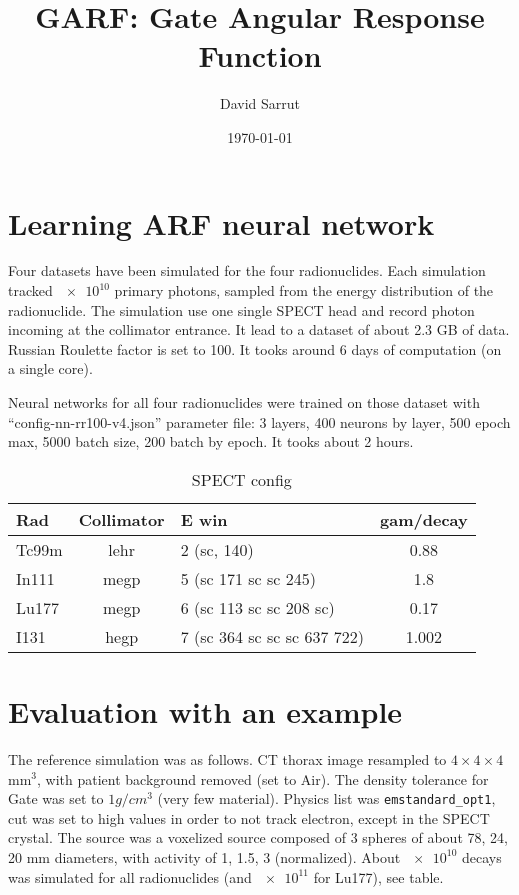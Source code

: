\documentclass[11pt,final,a4paper]{article}
\begin{document}
\thispagestyle{fancy}

\title{GARF: Gate Angular Response Function}
\author{David Sarrut}
\date{\today}

\maketitle

\section{Learning ARF neural network}

Four datasets have been simulated for the four radionuclides. Each
simulation tracked $\num{e10}$ primary photons, sampled from the
energy distribution of the radionuclide. The simulation use one single
SPECT head and record photon incoming at the collimator entrance. It
lead to a dataset of about 2.3 GB of data. Russian Roulette factor is
set to 100. It tooks around 6 days of computation (on a single core).


Neural networks for all four radionuclides were trained on those
dataset with ``config-nn-rr100-v4.json'' parameter file: 3 layers, 400
neurons by layer, 500 epoch max, 5000 batch size, 200 batch by
epoch. It tooks about 2 hours.

\begin{table}[htbp]
  \centering
  \begin{tabular}[htbp]{lclc}
    Rad & Collimator & E win & gam/decay \\\hline
    Tc99m & lehr & 2 (sc, 140) & 0.88 \\
    In111 & megp & 5 (sc 171 sc sc 245) &  1.8 \\
    Lu177 & megp & 6 (sc 113 sc sc 208 sc) & 0.17 \\
    I131 & hegp & 7 (sc 364 sc sc sc 637 722) & 1.002 \\
  \end{tabular}
  \caption{SPECT config}
  \label{tab:spect}  
\end{table}

\section{Evaluation with an example}

The reference simulation was as follows. CT thorax image resampled to
$4 \times 4 \times 4$ mm$^3$, with patient background removed (set to
Air). The density tolerance for Gate was set to $1 g/cm^3$ (very few
material). Physics list was \verb+emstandard_opt1+, cut was set to high
values in order to not track electron, except in the SPECT
crystal. The source was a voxelized source composed of 3 spheres of
about 78, 24, 20 mm diameters, with activity of 1, 1.5, 3
(normalized). About $\num{e10}$ decays was simulated for all
radionuclides (and $\num{e11}$ for Lu177), see table. 
\end{document}

